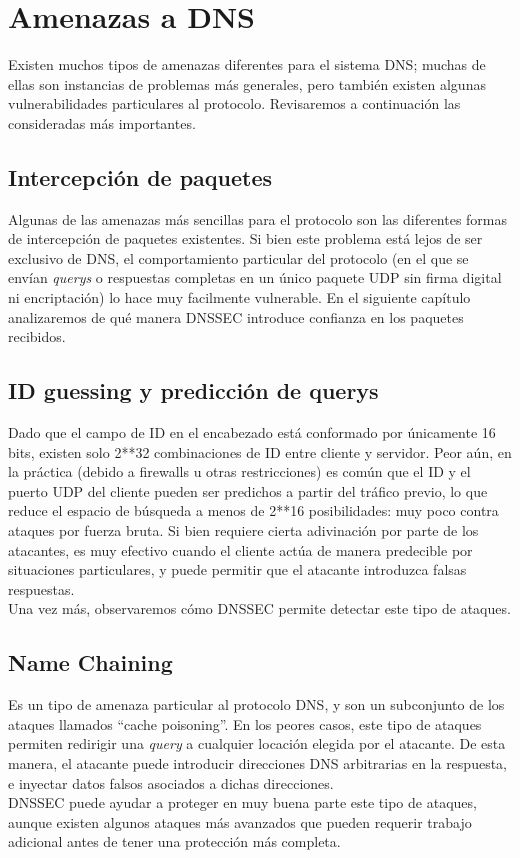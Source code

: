 \chapter{Amenazas a DNS}
Existen muchos tipos de amenazas diferentes para el sistema DNS; muchas de ellas son instancias de problemas m\'as generales, pero tambi\'en existen algunas vulnerabilidades particulares al protocolo. Revisaremos a continuaci\'on las consideradas m\'as importantes\cite{rfc3833}.
\section{Intercepci\'on de paquetes}
Algunas de las amenazas m\'as sencillas para el protocolo son las diferentes formas de intercepci\'on de paquetes existentes. Si bien este problema est\'a lejos de ser exclusivo de DNS, el comportamiento particular del protocolo (en el que se env\'ian \textit{querys} o respuestas completas en un \'unico paquete UDP sin firma digital ni encriptaci\'on) lo hace muy facilmente vulnerable. En el siguiente cap\'itulo analizaremos de qu\'e manera DNSSEC introduce confianza en los paquetes recibidos.
\section{ID guessing y predicci\'on de querys}
Dado que el campo de ID en el encabezado est\'a conformado por \'unicamente 16 bits, existen solo 2**32 combinaciones de ID entre cliente y servidor. Peor a\'un, en la pr\'actica (debido a firewalls u otras restricciones) es com\'un que el ID y el puerto UDP del cliente pueden ser predichos a partir del tr\'afico previo, lo que reduce el espacio de b\'usqueda a menos de 2**16 posibilidades: muy poco contra ataques por fuerza bruta. Si bien requiere cierta adivinaci\'on por parte de los atacantes, es muy efectivo cuando el cliente act\'ua de manera predecible por situaciones particulares, y puede permitir que el atacante introduzca falsas respuestas.\\
Una vez m\'as, observaremos c\'omo DNSSEC permite detectar este tipo de ataques.
\section{Name Chaining}
Es un tipo de amenaza particular al protocolo DNS, y son un subconjunto de los ataques llamados ``cache poisoning''. En los peores casos, este tipo de ataques permiten redirigir una \textit{query} a cualquier locaci\'on elegida por el atacante. De esta manera, el atacante puede introducir direcciones DNS arbitrarias en la respuesta, e inyectar datos falsos asociados a dichas direcciones.\\
DNSSEC puede ayudar a proteger en muy buena parte este tipo de ataques, aunque existen algunos ataques m\'as avanzados que pueden requerir trabajo adicional antes de tener una protecci\'on m\'as completa.
